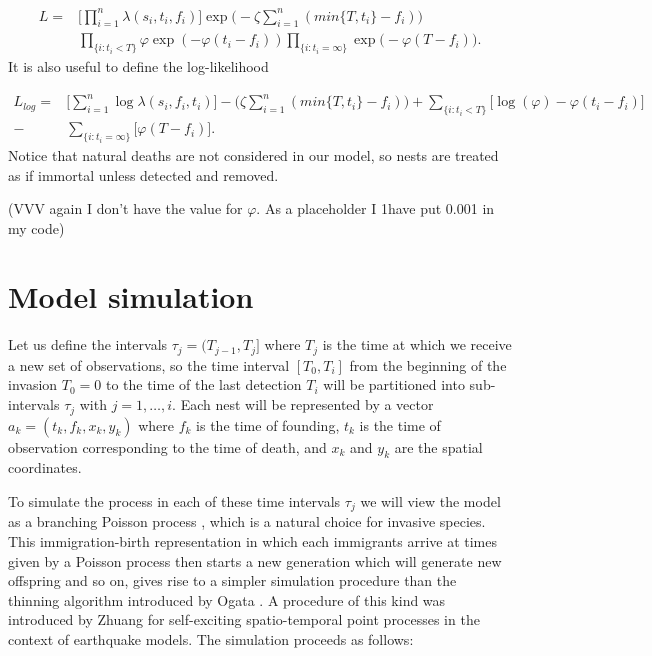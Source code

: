 \documentclass{article}
\begin{document}
\begin{equation*}
    \begin{aligned}
        L = & \Bigg[ \prod_{i = 1}^{n} \lambda(s_{i}, t_{i}, f_{i}) \Bigg] \exp \bigg(- \zeta \sum_{i=1}^{n} (min\{ T, t_i \} - f_i) \bigg) \\ 
        & \prod_{\{ i : t_{i} < T \} } \varphi \exp (- \varphi (t_{i} - f_{i})) \prod_{ \{ i : t_{i} = \infty \} } \exp \bigg( - \varphi(T - f_{i}) \bigg).
    \end{aligned}
\end{equation*}
It is also useful to define the log-likelihood

\begin{equation*}
    \begin{aligned}
        L_{log} = & \Bigg[ \sum_{i = 1}^{n} \log \lambda(s_{i},f_{i}, t_{i}) \Bigg] - \bigg(\zeta \sum_{i=1}^{n} (min\{ T, t_i \} - f_i) \bigg)  + \sum_{\{ i : t_{i} < T \} }  \bigg[\log (\varphi) -\varphi(t_{i} - f_{i}) \bigg] \\
        - & \sum_{ \{ i : t_{i} = \infty \} } \bigg[\varphi(T - f_{i}) \bigg].
    \end{aligned}
\end{equation*}
Notice that natural deaths are not considered in our model, so nests are treated as if immortal unless detected and removed.

(VVV again I don't have the value for $\varphi$. As a placeholder I 1have put 0.001 in my code)




\section{Model simulation} \label{section:simulationModel}

Let us define the intervals $\tau_j = (T_{j-1}, T_j]$ where $T_j$ is the time at which we receive a new set of observations, so the time interval $[T_0, T_i]$ from the beginning of the invasion $T_0=0$ to the time of the last detection $T_i$ will be partitioned into sub-intervals $\tau_j$ with $j = 1, \dots, i$. Each nest will be represented by a vector $a_k = (t_k, f_k, x_k, y_k)$ where $f_k$ is the time of founding, $t_k$ is the time of observation corresponding to the time of death, and $x_k$ and $y_k$ are the spatial coordinates.

To simulate the process in each of these time intervals $\tau_j$ we will view the model as a branching Poisson process \cite{Lewis}, which is a natural choice for invasive species. This immigration-birth representation in which each immigrants arrive at times given by a Poisson process then starts a new generation which will generate new offspring and so on, gives rise to a simpler simulation procedure than the thinning algorithm introduced by Ogata \cite{Ogata81}. A procedure of this kind was introduced by Zhuang \cite{Zhuang} for self-exciting spatio-temporal point processes in the context of earthquake models. The simulation proceeds as follows:
\end{document}
